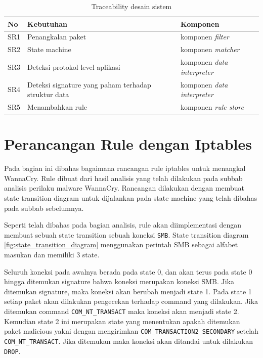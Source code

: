 \begin{table}[H]
	\caption{Traceability desain sistem}
	\label{table:system_traceability_design}
	\begin{tabularx}{\textwidth}{|l|X|X|}
		\hline
		\textbf{No} & \textbf{Kebutuhan} & \textbf{Komponen} \\ \hline
		SR1 & Penangkalan paket & komponen \textit{filter} \\ \hline 
		SR2 & State machine &  komponen \textit{matcher} \\ \hline
		SR3 & Deteksi protokol level aplikasi & komponen \textit{data interpreter} \\ \hline
		SR4 & Deteksi signature yang paham terhadap struktur data& komponen \textit{data interpreter} \\ \hline
		SR5 & Menambahkan rule & komponen \textit{rule store} \\ \hline
	\end{tabularx}
\end{table}

\section{Perancangan Rule dengan Iptables}

Pada bagian ini dibahas bagaimana rancangan rule iptables untuk menangkal WannaCry. Rule dibuat dari hasil analisis yang telah dilakukan pada subbab analisis perilaku malware WannaCry. Rancangan dilakukan dengan membuat state transition diagram untuk dijalankan pada state machine yang telah dibahas pada subbab sebelumnya.

Seperti telah dibahas pada bagian analisis, rule akan diimplementasi dengan membuat sebuah state transition sebuah koneksi \verb|SMB|. State transition diagram \ref{fig:state_transition_diagram} menggunakan perintah SMB sebagai alfabet masukan dan memiliki 3 state.

Seluruh koneksi pada awalnya berada pada state 0, dan akan terus pada state 0 hingga ditemukan signature bahwa koneksi merupakan koneksi SMB. Jika ditemukan signature, maka koneksi akan berubah menjadi state 1. Pada state 1 setiap paket akan dilakukan pengecekan terhadap command yang dilakukan. Jika ditemukan command \verb|COM_NT_TRANSACT| maka koneksi akan menjadi state 2. Kemudian state 2 ini merupakan state yang menentukan apakah ditemukan paket malicious yakni dengan mengirimkan \verb|COM_TRANSACTION2_SECONDARY| setelah \verb|COM_NT_TRANSACT|. Jika ditemukan maka koneksi akan ditandai untuk dilakukan \verb|DROP|.

